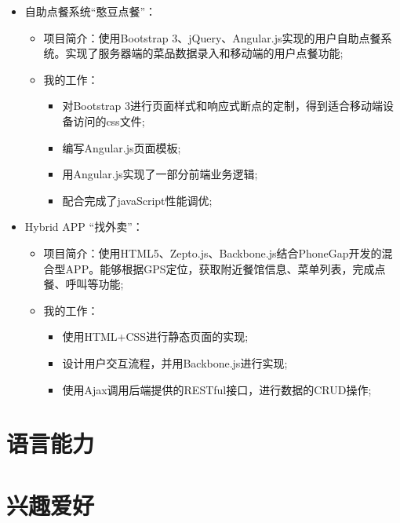 \documentclass[11pt,a4paper,sans]{moderncv}        %
\begin{document}
{\begin{itemize}
\begin{itemize}
\begin{itemize}
      \end{itemize}
  \end{itemize}
\item 自助点餐系统“憨豆点餐”：
  \begin{itemize}%
  \item 项目简介：使用Bootstrap 3、jQuery、Angular.js实现的用户自助点餐系统。实现了服务器端的菜品数据录入和移动端的用户点餐功能;
  \item 我的工作：
      \begin{itemize}%
        \item 对Bootstrap 3进行页面样式和响应式断点的定制，得到适合移动端设备访问的css文件;
        \item 编写Angular.js页面模板;
        \item 用Angular.js实现了一部分前端业务逻辑;
        \item 配合完成了javaScript性能调优;
      \end{itemize}
  \end{itemize}
\item Hybrid APP “找外卖”：
  \begin{itemize}%
  \item 项目简介：使用HTML5、Zepto.js、Backbone.js结合PhoneGap开发的混合型APP。能够根据GPS定位，获取附近餐馆信息、菜单列表，完成点餐、呼叫等功能;
  \item 我的工作：
      \begin{itemize}%
        \item 使用HTML+CSS进行静态页面的实现;
        \item 设计用户交互流程，并用Backbone.js进行实现;
        \item 使用Ajax调用后端提供的RESTful接口，进行数据的CRUD操作;
      \end{itemize}
  \end{itemize}
\end{itemize}}

\section{语言能力}



\section{兴趣爱好}
\end{document}
